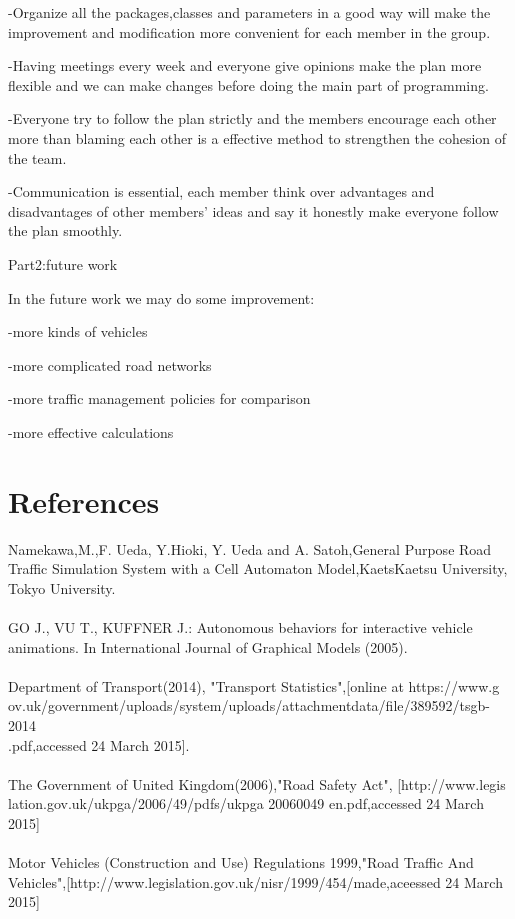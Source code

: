 \documentclass[12pt]{amsart}
\begin{document}
-Organize all the packages,classes and parameters in a good way will make the improvement and modification more convenient for each member in the group.

-Having meetings every week and everyone give opinions make the plan more flexible and we can make changes before doing the main part of programming.

-Everyone try to follow the plan strictly and the members encourage each other more than blaming each other is a effective method to strengthen the cohesion of the team.

-Communication is essential, each member think over advantages and disadvantages of other members' ideas and say it honestly make everyone follow the plan smoothly.

Part2:future work

In the future work we may do some improvement:

-more kinds of vehicles

-more complicated road networks

-more traffic management policies for comparison

-more effective calculations 

\section{References}

Namekawa,M.,F. Ueda, Y.Hioki, Y. Ueda and A. Satoh,General Purpose Road Traffic Simulation System with a
Cell Automaton Model,KaetsKaetsu University, Tokyo University.
\\\\
GO J., VU T., KUFFNER J.: Autonomous behaviors for interactive vehicle animations. In International Journal of Graphical Models (2005).
\\\\
Department of Transport(2014), "Transport Statistics",[online at https://www.g\\ov.uk/government/uploads/system/uploads/attachmentdata/file/389592/tsgb-2014\\.pdf,accessed 24 March 2015].
\\\\
The Government of United Kingdom(2006),"Road Safety Act", [http://www.legis\\lation.gov.uk/ukpga/2006/49/pdfs/ukpga 20060049 en.pdf,accessed 24 March 2015]
\\\\
Motor Vehicles (Construction and Use) Regulations 1999,"Road Traffic And Vehicles",[http://www.legislation.gov.uk/nisr/1999/454/made,aceessed 24 March 2015]
\end{document}
